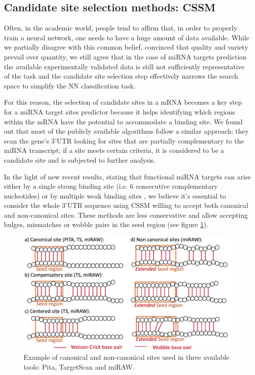 \subsection{Candidate site selection methods: CSSM}
Often, in the academic world, people tend to affirm that, in order to properly train a neural network, one needs to have a huge amount of data available. While we partially disagree with this common belief, convinced that quality and variety prevail over quantity, we still agree that in the case of miRNA targets prediction the available experimentally validated data is still not sufficiently representative of the task and the candidate site selection step effectively narrows the search space to simplify the NN classification task.

For this reason, the selection of candidate sites in a mRNA becomes a key step for a miRNA target sites predictor because it helps identifying which regions within the mRNA have the potential to accommodate a binding site. We found out that most of the publicly available algorithms follow a similar approach: they scan the gene's 3'UTR  looking for sites that are partially complementary to the miRNA transcript; if a site meets certain criteria, it is considered to be a candidate site and is subjected to further analysis.

In the light of new recent results, stating that functional miRNA targets can arise either by a single strong binding site (i.e. 6 consecutive complementary nucleotides) or by multiple weak binding sites \cite{helwak}, we believe it's essential to consider the whole 3'UTR sequence using CSSM willing to accept both canonical and non-canonical sites. These methods are less conservative and allow accepting bulges, mismatches or wobble pairs in the seed region (see figure \ref{fig:canonical}).

\begin{figure}[hbt!]
	\centering
	\includegraphics[width=1\textwidth]{Figures/canonical}
	\caption{Example of canonical and non-canonical sites used in three available tools: Pita, TargetScan and miRAW.}
	\label{fig:canonical}
\end{figure}

